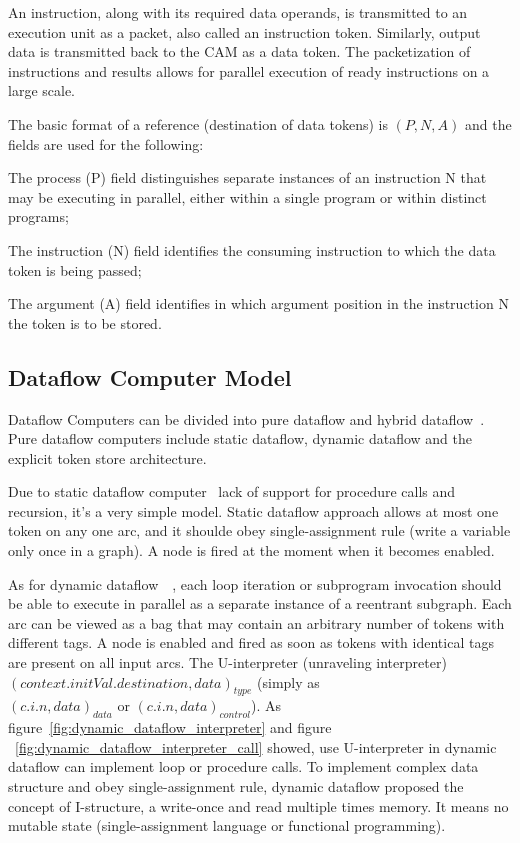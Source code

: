 \documentclass[UTF8,12pt,a4paper]{article}
\begin{document}
An instruction, along with its required data operands,
is transmitted to an execution unit as a packet, also called an instruction token.
Similarly, output data is transmitted back to the CAM as a data token.
The packetization of instructions and results allows for parallel execution of ready instructions on a large scale.

The basic format of a reference (destination of data tokens) is $(P, N, A)$
and the fields are used for the following:
\begin{compactitem}
  \item The process (P) field distinguishes separate instances
        of an instruction N that may be executing in parallel,
        either within a single program or within distinct programs;
  \item The instruction (N) field identifies the consuming instruction
        to which the data token is being passed;
  \item The argument (A) field identifies in which
        argument position in the instruction N the token is to be stored. 
\end{compactitem}

\subsection{Dataflow Computer Model}

Dataflow Computers can be divided into pure dataflow and hybrid dataflow~\cite{DBLP:books/daglib/0097728}.
Pure dataflow computers include static dataflow, dynamic dataflow and the explicit token store architecture.

Due to static dataflow computer~\cite{DBLP:conf/isca/DennisM74} lack of support for procedure calls and recursion, it's a very simple model.
Static dataflow approach allows at most one token on any one arc,
and it shoulde obey single-assignment rule (write a variable only once in a graph).
A node is fired at the moment when it becomes enabled.

As for dynamic dataflow~\cite{DBLP:journals/cacm/GurdKW85}~\cite{DBLP:journals/tc/ArvindN90},
each loop iteration or subprogram invocation should be able to
execute in parallel as a separate instance of a reentrant subgraph.
Each arc can be viewed as a bag that may contain an arbitrary number of tokens with different tags.
A node is enabled and fired as soon as tokens with identical tags are present on all input arcs.
The U-interpreter (unraveling interpreter) $(context.initVal.destination, data)_{type}$
(simply as $(c.i.n, data)_{data} \text{ or } (c.i.n, data)_{control}$).
As figure~\ref{fig:dynamic_dataflow_interpreter} and figure ~\ref{fig:dynamic_dataflow_interpreter_call} showed,
use U-interpreter in dynamic dataflow can implement loop or procedure calls.
To implement complex data structure and obey single-assignment rule,
dynamic dataflow proposed the concept of I-structure,
a write-once and read multiple times memory.
It means no mutable state (single-assignment language or functional programming).
\end{document}
